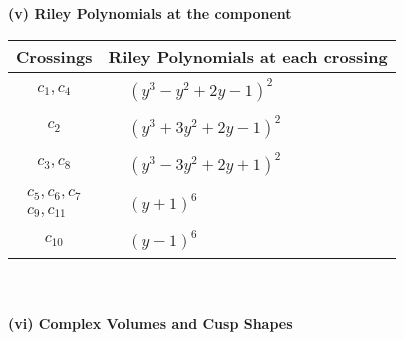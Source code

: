 \documentclass[1p]{elsarticle_modified}
\theoremstyle{definition}
\begin{document}
\newpage\renewcommand{\arraystretch}{1}
\flushleft \textbf{(v) Riley Polynomials at the component}\newline \\
\begin{tabular}{m{50pt}|m{274pt}}
Crossings & \hspace{64pt}Riley Polynomials at each crossing \\
\hline $$\begin{aligned}c_{1},c_{4}\end{aligned}$$&$\begin{aligned}
&(y^3- y^2+2 y-1)^2
\end{aligned}$\\
\hline $$\begin{aligned}c_{2}\end{aligned}$$&$\begin{aligned}
&(y^3+3 y^2+2 y-1)^2
\end{aligned}$\\
\hline $$\begin{aligned}c_{3},c_{8}\end{aligned}$$&$\begin{aligned}
&(y^3-3 y^2+2 y+1)^2
\end{aligned}$\\
\hline $$\begin{aligned}c_{5},c_{6},c_{7}\\c_{9},c_{11}\end{aligned}$$&$\begin{aligned}
&(y+1)^6
\end{aligned}$\\
\hline $$\begin{aligned}c_{10}\end{aligned}$$&$\begin{aligned}
&(y-1)^6
\end{aligned}$\\
\hline
\end{tabular}\\~\\
\newpage\flushleft \textbf{(vi) Complex Volumes and Cusp Shapes}
\end{document}
